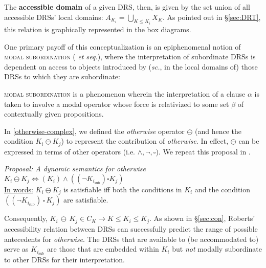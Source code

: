 \noindent The \textbf{accessible domain} of a given DRS, then, is given by the set union of all accessible DRSs' local domains: $ A_{K_i}=\underset{K\leqslant K_i}{\bigcup}X_K$. As pointed out in \S\ref{sec:DRT}, this relation is graphically represented in the box diagrams. 

One primary payoff of this conceptualization is an epiphenomenal notion of \textsc{modal subordination} (\citealt{Roberts1989} \textit{et seq.}), where the interpretation of subordinate DRSs is dependent on access to objects introduced by (\textit{sc.}, in the local domains of) those DRSs to which they are subordinate:

\pex\textsc{modal subordination} is a phenomenon wherein the interpretation of a clause $ \alpha $ is taken to involve a modal operator whose force is relativized to some set $ \beta $ of contextually given propositions.\hfill\citep[718]{Roberts1989}\xe




In \ref{otherwise-complex}, we defined the \textit{otherwise} operator $ \ominus $ (and hence the condition $ K_i\ominus K_j$) to represent the contribution of \textit{otherwise}. In effect, $ \ominus $ can be expressed in terms of other operators (i.e. $ \wedge,\neg,\square $). %
  We repeat this proposal in \nextx.

\pex\label{otherwise-complex-again} \textit{Proposal: A dynamic semantics for \emph{otherwise}}\\
$ K_i\ominus K_j\iff (K_i) \wedge ((\neg K_{i_{\text{sub}}}) \square K_j) $\\
\uline{In words:} $ K_i\ominus K_j$ is satisfiable iff both the conditions in $ K_i $ and the condition $ ((\neg K_{i_{\text{sub}}}) \,\square\, K_j)$ are satisfiable.\xe

Consequently, $ K_i\,\ominus\,K_j\in C_K\to K\leqslant K_i\leqslant K_j $. As shown in \S\ref{sec:con}, Roberts' accessibility relation between DRSs can successfully predict the range of possible antecedents for \textit{otherwise}. The DRSs that are available to (be accommodated to) serve as $ K_{i_{\text{sub}}} $ are those that are embedded within $ K_i $ but \textit{not} modally subordinate to other DRSs for their interpretation.

